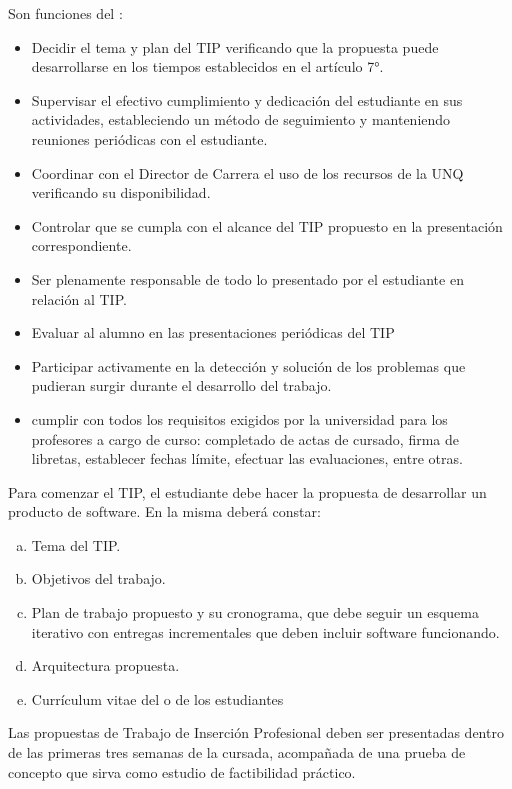 \articulo Son funciones del \profesorTIP :
\begin{itemize}
 \item Decidir el tema y plan del TIP verificando que la
 propuesta puede desarrollarse en los tiempos establecidos en el
 artículo 7°.
 \item Supervisar el efectivo cumplimiento y dedicación del estudiante en
 sus actividades, estableciendo un método de seguimiento y
 manteniendo reuniones periódicas con el estudiante.
 \item Coordinar con el Director de Carrera el uso de los recursos de la
 UNQ verificando su disponibilidad.
 \item Controlar que se cumpla con el alcance del TIP propuesto en la
 presentación correspondiente.
 \item Ser plenamente responsable de todo lo presentado por el
 estudiante en relación al TIP.
 \item Evaluar al alumno en las presentaciones periódicas del TIP
 \item Participar activamente en la detección y solución de los problemas
 que pudieran surgir durante el desarrollo del trabajo.
 \item cumplir con todos los requisitos exigidos por la universidad para los profesores a cargo de curso:
 completado de actas de cursado, firma de libretas, establecer fechas límite, efectuar las evaluaciones,
 entre otras.
\end{itemize}



\articulo Para comenzar el TIP, el estudiante debe hacer la propuesta de desarrollar un producto de
software. En la misma deberá constar:

\begin{enumerate}[a.]
\item Tema del TIP.
\item Objetivos del trabajo.
\item Plan de trabajo propuesto y su cronograma, que debe seguir un esquema iterativo con entregas
incrementales que deben incluir software funcionando.
\item Arquitectura propuesta.
\item Currículum vitae del o de los estudiantes
\end{enumerate}

\articulo Las propuestas de Trabajo de Inserción Profesional deben ser presentadas
dentro de las primeras tres semanas de la cursada, acompañada de una prueba de concepto
que sirva como estudio de factibilidad práctico.

